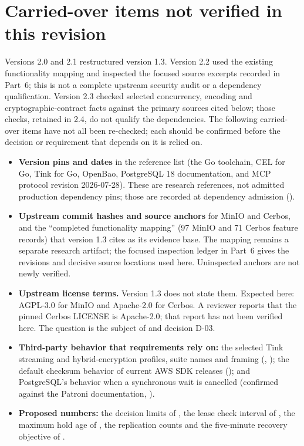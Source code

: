\section{Carried-over items not verified in this revision}\label{app:unverified}
Versions 2.0 and 2.1 restructured version 1.3. Version 2.2 used the existing functionality mapping and inspected the focused source excerpts recorded in Part~6; this is not a complete upstream security audit or a dependency qualification. Version 2.3 checked selected concurrency, encoding and cryptographic-contract facts against the primary sources cited below; those checks, retained in 2.4, do not qualify the dependencies. The following carried-over items have not all been re-checked; each should be confirmed before the decision or requirement that depends on it is relied on.
\begin{itemize}
\item \textbf{Version pins and dates} in the reference list (the Go toolchain, CEL for Go, Tink for Go, OpenBao, PostgreSQL 18 documentation, and MCP protocol revision 2026-07-28). These are research references, not admitted production dependency pins; those are recorded at dependency admission ().
\item \textbf{Upstream commit hashes and source anchors} for MinIO and Cerbos, and the ``completed functionality mapping'' (97 MinIO and 71 Cerbos feature records) that version 1.3 cites as its evidence base. The mapping remains a separate research artifact; the focused inspection ledger in Part~6 gives the revisions and decisive source locations used here. Uninspected anchors are not newly verified.
\item \textbf{Upstream license terms.} Version 1.3 does not state them. Expected here: AGPL-3.0 for MinIO and Apache-2.0 for Cerbos. A reviewer reports that the pinned Cerbos LICENSE is Apache-2.0; that report has not been verified here. The question is the subject of  and decision D-03.
\item \textbf{Third-party behavior that requirements rely on:} the selected Tink streaming and hybrid-encryption profiles, suite names and framing (, ); the default checksum behavior of current AWS SDK releases (); and PostgreSQL's behavior when a synchronous wait is cancelled (confirmed against the Patroni documentation, ).
\item \textbf{Proposed numbers:} the decision limits of , the lease check interval of , the maximum hold age of , the replication counts and the five-minute recovery objective of .
\end{itemize}


